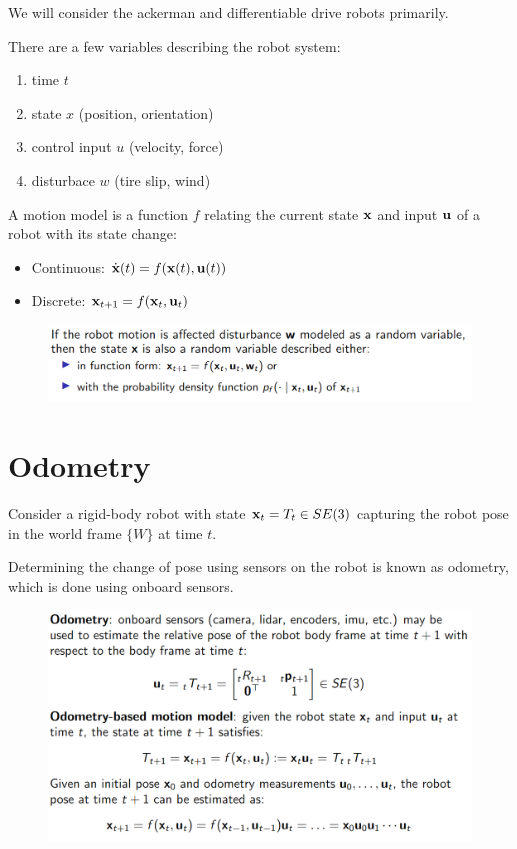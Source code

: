 We will consider the ackerman and differentiable drive robots primarily.

There are a few variables describing the robot system:

\begin{enumerate}
    \item time $t$
    \item state $x$ (position, orientation)
    \item control input $u$ (velocity, force)
    \item disturbace $w$ (tire slip, wind)
\end{enumerate}

A motion model is a function $f$ relating the current state $\textbf{x}$ and input $\textbf{u}$ of a robot with its state change:

\begin{itemize}
    \item Continuous: $\dot{\textbf{x}}(t) = f(\textbf{x}(t), \textbf{u}(t))$
    \item Discrete: $\textbf{x}_{t+1} = f(\textbf{x}_t, \textbf{u}_t)$
\end{itemize}

\begin{figure}[h]\centering\includegraphics[width=12cm]{img/j_4_6.png}\end{figure}

\section{Odometry}

Consider a rigid-body robot with state $\textbf{x}_t = T_t \in SE (3)$ capturing the robot pose in the world frame $\{W \}$ at time $t$.

Determining the change of pose using sensors on the robot is known as odometry, which is done using onboard sensors.

\begin{figure}[h]\centering\includegraphics[width=12cm]{img/j_4_7.png}\end{figure}

